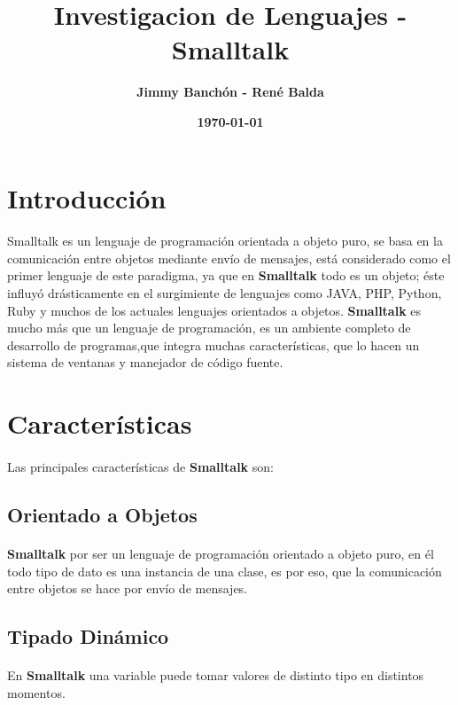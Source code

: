 \documentclass[11pt]{article}
\title{\textbf{Investigacion de Lenguajes - Smalltalk}}
\author{\textbf{Jimmy Banchón - René Balda}}
\date{\textbf{\today}}
\begin{document}


\maketitle
\section{\textbf{Introducción}} 
\paragraph{} \noindent
Smalltalk es un lenguaje de programación orientada a objeto puro, se basa en la comunicación entre objetos mediante envío de mensajes, está considerado como el primer lenguaje de este paradigma, ya que  en \textbf{Smalltalk} todo es un objeto; éste influyó drásticamente en el surgimiente de lenguajes como JAVA, PHP, Python, Ruby y muchos de los actuales lenguajes orientados a objetos.
 \textbf{Smalltalk} es mucho más que un lenguaje de programación, es un ambiente completo de desarrollo de programas,que integra muchas características, que lo hacen un sistema de ventanas y manejador de código fuente.
\section{\textbf{Características}}
\paragraph{} \noindent
Las principales características de  \textbf{Smalltalk} son:
\subsection{\textbf{Orientado a Objetos}}
\paragraph{} \noindent
\textbf{Smalltalk} por ser un lenguaje de programación orientado a objeto puro, en él todo tipo de dato es una instancia de una clase, es por eso, que la comunicación entre objetos se hace por envío de mensajes.
\subsection{\textbf{Tipado Dinámico}}
\paragraph{} \noindent
En \textbf{Smalltalk} una variable puede tomar valores de distinto tipo en distintos momentos.
\end{document}
